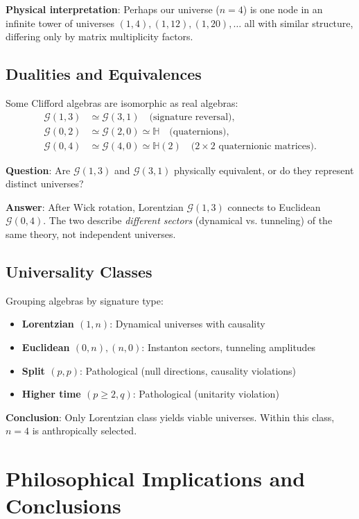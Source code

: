 \documentclass[11pt,a4paper]{article}
\numberwithin{equation}{section}
\theoremstyle{plain}
\theoremstyle{definition}
\theoremstyle{remark}
\newcommand{\Cl}{\mathcal{G}}               %
\begin{document}
\textbf{Physical interpretation}: Perhaps our universe ($n=4$) is one node in an infinite tower of universes $(1,4), (1,12), (1,20), \ldots$ all with similar structure, differing only by matrix multiplicity factors.

\subsection{Dualities and Equivalences}

Some Clifford algebras are isomorphic as real algebras:
\begin{align}
\Cl(1,3) &\simeq \Cl(3,1) \quad \text{(signature reversal)},\\
\Cl(0,2) &\simeq \Cl(2,0) \simeq \mathbb{H} \quad \text{(quaternions)},\\
\Cl(0,4) &\simeq \Cl(4,0) \simeq \mathbb{H}(2) \quad \text{($2 \times 2$ quaternionic matrices)}.
\end{align}

\textbf{Question}: Are $\Cl(1,3)$ and $\Cl(3,1)$ physically equivalent, or do they represent distinct universes?

\textbf{Answer}: After Wick rotation, Lorentzian $\Cl(1,3)$ connects to Euclidean $\Cl(0,4)$. The two describe \emph{different sectors} (dynamical vs. tunneling) of the same theory, not independent universes.

\subsection{Universality Classes}

Grouping algebras by signature type:

\begin{itemize}
\item \textbf{Lorentzian $(1,n)$}: Dynamical universes with causality
\item \textbf{Euclidean $(0,n), (n,0)$}: Instanton sectors, tunneling amplitudes
\item \textbf{Split $(p,p)$}: Pathological (null directions, causality violations)
\item \textbf{Higher time $(p \geq 2, q)$}: Pathological (unitarity violation)
\end{itemize}

\textbf{Conclusion}: Only Lorentzian class yields viable universes. Within this class, $n=4$ is anthropically selected.

\section{Philosophical Implications and Conclusions}
\label{sec:conclusion}
\end{document}

